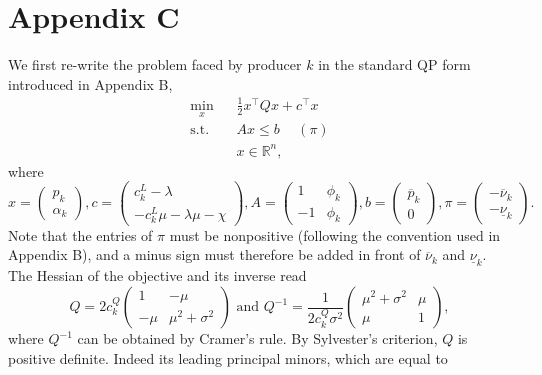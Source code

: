 \documentclass{article}
\begin{document}
\section*{Appendix C}

We first re-write the problem faced by producer $k$ in the standard QP form introduced in Appendix B,
\begin{align*}
\underset{x}{\min} \hspace{10pt} & \frac{1}{2}x^\top Q x + c^\top x\\
\mbox{s.t. } & Ax \le b \hspace{15pt} (\pi)\\
&x \in \mathbb{R}^n,
\end{align*}
where
\begin{equation*}
x = \begin{pmatrix} p_k \\ \alpha_k \end{pmatrix}, c = \begin{pmatrix} c_k^L - \lambda \\ -c_k^L \mu - \lambda \mu - \chi \end{pmatrix}, A = \begin{pmatrix} 1 & \phi_k \\ -1 & \phi_k \end{pmatrix}, b = \begin{pmatrix} \overline{p}_k\\0\end{pmatrix}, \pi = \begin{pmatrix} -\overline{\nu}_k \\ -\underline{\nu}_k \end{pmatrix}.
\end{equation*}
Note that the entries of $\pi$ must be nonpositive (following the convention used in Appendix B), and a minus sign must therefore be added in front of $\overline{\nu}_k$ and $\underline{\nu}_k$. The Hessian of the objective and its inverse read
\begin{equation*}
Q = 2 c_k^Q  \begin{pmatrix} 1 & -\mu \\ -\mu & \mu^2 + \sigma^2 \end{pmatrix} \mbox{ and } Q^{-1} = \frac{1}{2 c_k^Q \sigma^2} \begin{pmatrix} \mu^2 + \sigma^2 & \mu \\ \mu & 1 \end{pmatrix},
\end{equation*}
where $Q^{-1}$ can be obtained by Cramer's rule. By Sylvester's criterion, $Q$ is positive definite. Indeed its leading principal minors, which are equal to 
\end{document}
